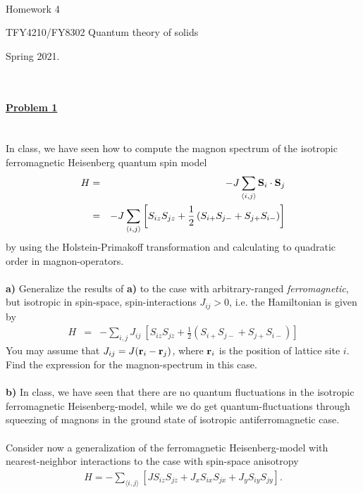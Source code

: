 \documentclass{article}
\begin{document}
\\

\centerline{\Large Homework 4}
\centerline{\Large  TFY4210/FY8302 Quantum theory of solids}
\centerline{\Large Spring 2021.}
\normalsize
\ \\
\ \\
\underline{\large\bf Problem 1 }\\
\ \\
\ \\
In class, we have seen how to compute the magnon spectrum of the isotropic ferromagnetic Heisenberg quantum spin model
\begin{eqnarray}
H & = & - J \sum_{\langle i,j\rangle} {\bf S} _i \cdot {\bf S}_j \nonumber \\
  & = & -    J \sum_{\langle i,j\rangle} \left[S_{iz}  S_{jz} + \frac{1}{2}   \left(S_{i+} S_{j-} + S_{j+} S_{i-} \right)  \right] \nonumber
\end{eqnarray}  
by using the Holstein-Primakoff transformation and calculating to quadratic order in magnon-operators. 
\ \\
\ \\
{\bf a)} Generalize the results of {\bf a)} to the case with arbitrary-ranged {\it ferromagnetic}, but isotropic in spin-space, spin-interactions $J_{ij}>0$, i.e. the Hamiltonian is given by 
\begin{eqnarray}
H  & = & -  \sum_{i,j} J_{ij} ~ \left[S_{iz}  S_{jz} + \frac{1}{2}   \left(S_{i+} S_{j-} + S_{j+} S_{i-} \right)  \right] \nonumber
\end{eqnarray}  
You may assume that $J_{ij}= J({\bf r}_i-{\bf r}_j)$, where ${\bf r}_i$ is the position of lattice site $i$. Find the expression for the magnon-spectrum in this case. 
\ \\
\ \\
{\bf b)} In class, we have seen that there are no quantum fluctuations in the isotropic ferromagnetic Heisenberg-model, while we do get quantum-fluctuations through squeezing of magnons in the ground state of isotropic antiferromagnetic case. 
\ \\
\ \\
Consider now a generalization of the ferromagnetic Heisenberg-model with nearest-neighbor interactions to the case with spin-space anisotropy
\begin{eqnarray}
H = - \sum_{\langle i,j \rangle} \left[ J S_{iz} S_{jz} + J_x S_{ix} S_{jx} + J_y S_{iy} S_{jy} \right]. \nonumber
\end{eqnarray} 
\end{document}
